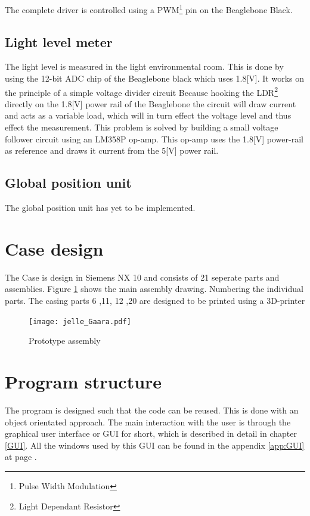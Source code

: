 \documentclass[11pt,fleqn,,a4paper,twoside,openright]{book}
\begin{document}
The complete driver is controlled using a PWM\footnote{Pulse Width Modulation} pin on the Beaglebone Black.

\subsection{Light level meter}
The light level is measured in the light environmental room. This is done by using the 12-bit ADC chip of the Beaglebone black which uses 1.8[V]. It works on the principle of a simple voltage divider circuit Because hooking the LDR\footnote{Light Dependant Resistor} directly on the 1.8[V] power rail of the Beaglebone the circuit will draw current and acts as a variable load, which will in turn effect the voltage level and thus effect the measurement.
This problem is solved by building a small voltage follower circuit using an LM358P op-amp. This op-amp uses the 1.8[V] power-rail as reference and draws it current from the 5[V] power rail.

\subsection{Global position unit}
The global position unit has yet to be implemented.
\newpage

\section{Case design}
The Case is design in Siemens NX 10 and consists of 21 seperate parts and assemblies. Figure \ref{fig:Design} shows the main assembly drawing. Numbering the individual parts. The casing parts 6 ,11, 12 ,20 are designed to be printed using a 3D-printer
\begin{figure}[h]
	\texttt{[image: jelle\_Gaara.pdf]}
	\caption{Prototype assembly}\label{fig:Design}
\end{figure}

\section{Program structure}
The program is designed such that the code can be reused. This is done with an object orientated approach. The main interaction with the user is through the graphical user interface or GUI for short, which is described in detail in chapter \ref{GUI}. All the windows used by this GUI can be found in the appendix \ref{app:GUI} at page \pageref{app:GUI}.
\end{document}
